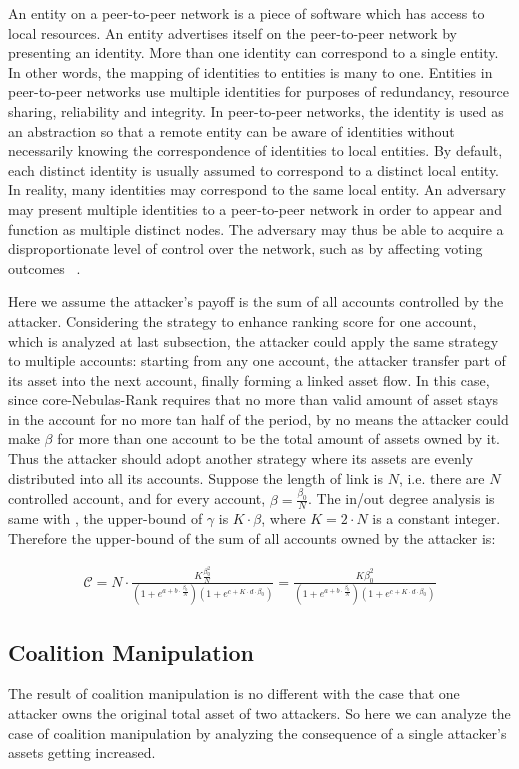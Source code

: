 An entity on a peer-to-peer network is a piece of software which has access to local resources. An entity advertises itself on the peer-to-peer network by presenting an identity. More than one identity can correspond to a single entity. In other words, the mapping of identities to entities is many to one. Entities in peer-to-peer networks use multiple identities for purposes of redundancy, resource sharing, reliability and integrity. In peer-to-peer networks, the identity is used as an abstraction so that a remote entity can be aware of identities without necessarily knowing the correspondence of identities to local entities. By default, each distinct identity is usually assumed to correspond to a distinct local entity. In reality, many identities may correspond to the same local entity. An adversary may present multiple identities to a peer-to-peer network in order to appear and function as multiple distinct nodes. The adversary may thus be able to acquire a disproportionate level of control over the network, such as by affecting voting outcomes ~\cite{wiki:sybil}.

Here we assume the attacker's payoff is the sum of all accounts controlled by the attacker. Considering the strategy to enhance ranking score for one account, which is analyzed at last subsection, the attacker could apply the same strategy to multiple accounts: starting from any one account, the attacker transfer part of its asset into the next account, finally forming a linked asset flow. In this case, since core-Nebulas-Rank requires that no more than valid amount of asset stays in the account for no more tan half of the period, by no means the attacker could make $\beta$ for more than one account to be the total amount of assets owned by it. Thus the attacker should adopt another strategy where its assets are evenly distributed into all its accounts. Suppose the length of link is $N$, i.e. there are $N$ controlled account, and for every account, $\beta = \frac{\beta_0}{N}$. The in/out degree analysis is same with , the upper-bound of $\gamma$ is $K \cdot \beta$, where $K=2\cdot N$ is a constant integer. Therefore the upper-bound of the sum of all accounts owned by the attacker is:

\begin{align}
\mathcal{C} = N \cdot \frac{K \frac{\beta_0 ^2}{N}}{ (1+e^{a + b \cdot \frac{\beta_0}{N} }) (1+e^{c + K \cdot d \cdot \beta_0})} = \frac{K \beta_0 ^2 }{ (1+e^{a + b \cdot \frac{\beta_0}{N} }) (1+e^{c + K \cdot d \cdot \beta_0})} 
\end{align}


\subsection{Coalition Manipulation \label{sec:coalition}}
The result of coalition manipulation is no different with the case that one attacker owns the original total asset of two attackers. So here we can analyze the case of coalition manipulation by analyzing the consequence of a single attacker's assets getting increased.



